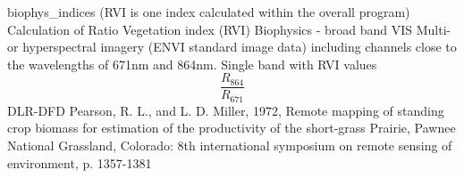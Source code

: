 %
{ %
biophys\_indices (RVI is one index calculated within the overall program)
}
%
{ %
Calculation of Ratio Vegetation index (RVI)
}
%
{ %
Biophysics - broad band VIS
}
%
{ %
Multi- or hyperspectral imagery (ENVI standard image data) including channels close to the wavelengths of 671nm and 864nm.\bigskip
}
%
{ %
Single band with RVI values
}
%
{ %
\begin{displaymath}
 \frac{R_{864}}{R_{671}}
\end{displaymath}
}
%
{ %
DLR-DFD
}
%
{ %
Pearson, R. L., and L. D. Miller, 1972, Remote mapping of standing crop biomass for estimation of the productivity of the short-grass Prairie, Pawnee National Grassland,
Colorado: 8th international symposium on remote sensing of environment, p. 1357-1381
}


